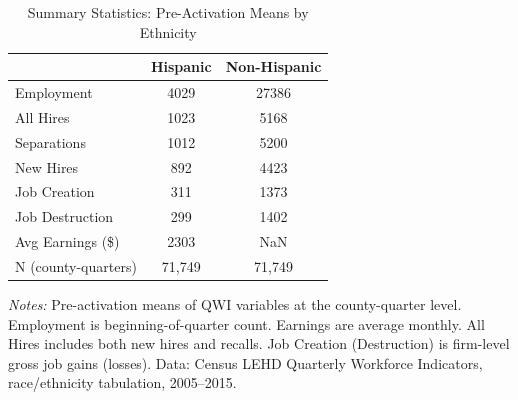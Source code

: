 \begin{table}[htbp]
\centering
\caption{Summary Statistics: Pre-Activation Means by Ethnicity}
\label{tab:sumstats}
\begin{tabular}{lcc}
\toprule
& Hispanic & Non-Hispanic \\
\midrule
Employment & 4029 & 27386 \\
All Hires & 1023 & 5168 \\
Separations & 1012 & 5200 \\
New Hires & 892 & 4423 \\
Job Creation & 311 & 1373 \\
Job Destruction & 299 & 1402 \\
Avg Earnings (\$) & 2303 & NaN \\
N (county-quarters) & 71,749 & 71,749 \\
\bottomrule
\end{tabular}
\begin{tablenotes}[flushleft]
\small
\item \textit{Notes:} Pre-activation means of QWI variables at the county-quarter level. Employment is beginning-of-quarter count. Earnings are average monthly. All Hires includes both new hires and recalls. Job Creation (Destruction) is firm-level gross job gains (losses). Data: Census LEHD Quarterly Workforce Indicators, race/ethnicity tabulation, 2005--2015.
\end{tablenotes}
\end{table}

